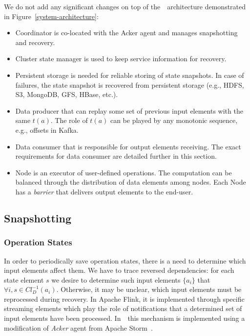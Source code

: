 We do not add any significant changes on top of the~\FlameStream\ architecture demonstrated in Figure~\ref{system-architecture}:
\begin{itemize}
    \item Coordinator is co-located with the Acker agent and manages snapshotting and recovery.
    \item Cluster state manager is used to keep service information for recovery.
    \item Persistent storage is needed for reliable storing of state snapshots. In case of failures, the state snapshot is recovered from persistent storage (e.g., HDFS, S3, MongoDB, GFS, HBase, etc.).
    \item Data producer that can replay some set of previous input elements with the same $t(a)$. The role of $t(a)$ can be played by any monotonic sequence, e.g., offsets in Kafka.
    \item Data consumer that is responsible for output elements receiving. The exact requirements for data consumer are detailed further in this section.
    \item Node is an executor of user-defined operations. The computation can be balanced through the distribution of data elements among nodes. Each Node has a {\em barrier} that delivers output elements to the end-user.
\end{itemize}

\subsection{Snapshotting}

\subsubsection{Operation States}

In order to periodically save operation states, there is a need to determine which input elements affect them. 
 We have to trace reversed dependencies: for each state element $s$ we desire to determine such input elements $\{a_i\}$ that $\forall i, s \in Cl_D^{-1}(a_i)$. Otherwise, it may be unclear, which input elements must be reprocessed during recovery. In Apache Flink, it is implemented through specific streaming elements which play the role of notifications that a determined set of input elements have been processed. In~\FlameStream\ this mechanism is implemented using a modification of {\em Acker} agent from Apache Storm~\cite{apache:storm}. 

